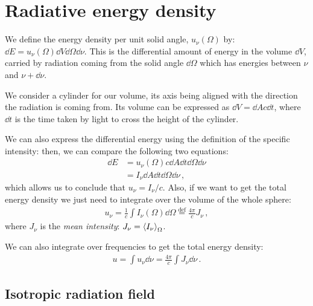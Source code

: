 \documentclass[main.tex]{subfiles}
\begin{document}

\section{Radiative energy density}

We define the energy density per unit solid angle, \(u_{\nu }(\Omega )\) by: \(\dd{E} = u_{\nu } (\Omega ) \dd{V} \dd{\Omega } \dd{\nu }\).
This is the differential amount of energy in the volume \(\dd{V}\), carried by radiation coming from the solid angle \(\dd{\Omega }\) which has energies between  \(\nu \) and \(\nu + \dd{\nu }\). 

We consider a cylinder for our volume, its axis being aligned with the direction the radiation is coming from. 
Its volume can be expressed as \(\dd{V} =\dd{A} c \dd{t}\), where \(\dd{t}\) is the time taken by light to cross the height of the cylinder.

We can also express the differential energy using the definition of the specific intensity: then, we can compare the following two equations: 
%
\begin{subequations}
\begin{align}
\dd{E} &= u_{\nu } (\Omega ) c \dd{A} \dd{t} \dd{\Omega } \dd{\nu }  \\
&= I_{\nu } \dd{A} \dd{t} \dd{\Omega } \dd{\nu }
\,,
\end{align}
\end{subequations}
%
which allows us to conclude that \(u_{\nu } = I_{ \nu } / c\).
Also, if we want to get the total energy density we just need to integrate over the volume of the whole sphere: 
%
\begin{align}
u_{\nu } = \frac{1}{c} \int I_{\nu }  (\Omega ) \dd{\Omega }
\overset{\text{def}}{=} \frac{4 \pi }{c} J_{\nu }
\,,
\end{align}
%
where \(J_{\nu  }\) is the \emph{mean intensity}: \(J_{\nu } = \expval{I_{\nu }}_{\Omega }\). 

We can also integrate over frequencies to get the total energy density: 
%
\begin{align}
u = \int u_{\nu } \dd{\nu } = \frac{4 \pi }{c} \int J_{\nu } \dd{\nu }
\,.
\end{align}

\subsection{Isotropic radiation field}
\end{document}
